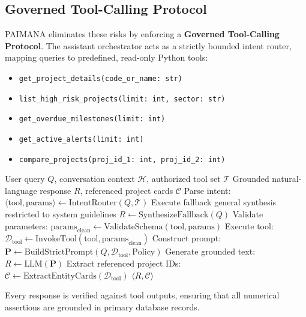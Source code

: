 \documentclass[conference]{IEEEtran}
\begin{document}
\subsection{Governed Tool-Calling Protocol}
PAIMANA eliminates these risks by enforcing a \textbf{Governed Tool-Calling Protocol}. The assistant orchestrator acts as a strictly bounded intent router, mapping queries to predefined, read-only Python tools:
\begin{itemize}
    \item \texttt{get\_project\_details(code\_or\_name: str)}
    \item \texttt{list\_high\_risk\_projects(limit: int, sector: str)}
    \item \texttt{get\_overdue\_milestones(limit: int)}
    \item \texttt{get\_active\_alerts(limit: int)}
    \item \texttt{compare\_projects(proj\_id\_1: int, proj\_id\_2: int)}
\end{itemize}

\begin{algorithm}[htbp]
\caption{Safe Governed Assistant Execution Loop}
\label{alg_assistant}
\begin{algorithmic}[1]
\REQUIRE User query $Q$, conversation context $\mathcal{H}$, authorized tool set $\mathcal{T}$
\ENSURE Grounded natural-language response $R$, referenced project cards $\mathcal{C}$
\STATE Parse intent: $\langle \text{tool}, \text{params} \rangle \leftarrow \text{IntentRouter}(Q, \mathcal{T})$
    \STATE Execute fallback general synthesis restricted to system guidelines
    \RETURN $R \leftarrow \text{SynthesizeFallback}(Q)$
\ENDIF
\STATE Validate parameters: $\text{params}_{\text{clean}} \leftarrow \text{ValidateSchema}(\text{tool}, \text{params})$
\STATE Execute tool: $\mathcal{D}_{\text{tool}} \leftarrow \text{InvokeTool}(\text{tool}, \text{params}_{\text{clean}})$
\STATE Construct prompt: $\mathbf{P} \leftarrow \text{BuildStrictPrompt}(Q, \mathcal{D}_{\text{tool}}, \text{Policy})$
\STATE Generate grounded text: $R \leftarrow \text{LLM}(\mathbf{P})$
\STATE Extract referenced project IDs: $\mathcal{C} \leftarrow \text{ExtractEntityCards}(\mathcal{D}_{\text{tool}})$
\RETURN $\langle R, \mathcal{C} \rangle$
\end{algorithmic}
\end{algorithm}

Every response is verified against tool outputs, ensuring that all numerical assertions are grounded in primary database records.
\end{document}
